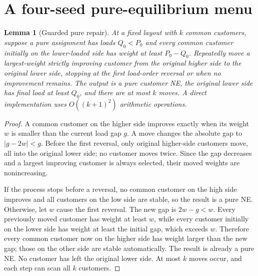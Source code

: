 \documentclass[11pt]{article}
\newtheorem{lemma}[theorem]{Lemma}
\theoremstyle{definition}
\theoremstyle{remark}
\begin{document}
\section{A four-seed pure-equilibrium menu}\label{sec:repair}

\begin{lemma}[Guarded pure repair]\label{lem:preserve}
At a fixed layout with $k$ common customers, suppose a pure assignment has loads $Q_0<P_0$ and every common customer initially on the lower-loaded side has weight at least $P_0-Q_0$. Repeatedly move a largest-weight strictly improving customer from the original higher side to the original lower side, stopping at the first load-order reversal or when no improvement remains. The output is a pure customer NE, the original lower side has final load at least $Q_0$, and there are at most $k$ moves. A direct implementation uses $O((k+1)^2)$ arithmetic operations.
\end{lemma}
\begin{proof}
A common customer on the higher side improves exactly when its weight $w$ is smaller than the current load gap $g$. A move changes the absolute gap to $|g-2w|<g$. Before the first reversal, only original higher-side customers move, all into the original lower side; no customer moves twice. Since the gap decreases and a largest improving customer is always selected, their moved weights are nonincreasing.

If the process stops before a reversal, no common customer on the high side improves and all customers on the low side are stable, so the result is a pure NE. Otherwise, let $w$ cause the first reversal. The new gap is $2w-g<w$. Every previously moved customer has weight at least $w$, while every customer initially on the lower side has weight at least the initial gap, which exceeds $w$. Therefore every common customer now on the higher side has weight larger than the new gap; those on the other side are stable automatically. The result is already a pure NE. No customer has left the original lower side. At most $k$ moves occur, and each step can scan all $k$ customers.
\end{proof}
\end{document}
